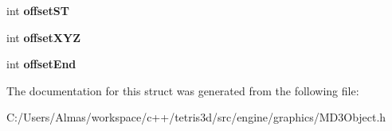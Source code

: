 \begin{DoxyCompactItemize}
\item 
\hypertarget{struct_surface_ad45e1c14f0ad7da8318575974d461d50}{int {\bfseries offset\-S\-T}}\label{struct_surface_ad45e1c14f0ad7da8318575974d461d50}

\item 
\hypertarget{struct_surface_affc32d8546d0131a35da7cce858ecdb4}{int {\bfseries offset\-X\-Y\-Z}}\label{struct_surface_affc32d8546d0131a35da7cce858ecdb4}

\item 
\hypertarget{struct_surface_a8e2c382ec7c59175e2a0b0475210c798}{int {\bfseries offset\-End}}\label{struct_surface_a8e2c382ec7c59175e2a0b0475210c798}

\end{DoxyCompactItemize}


The documentation for this struct was generated from the following file\-:\begin{DoxyCompactItemize}
\item 
C\-:/\-Users/\-Almas/workspace/c++/tetris3d/src/engine/graphics/M\-D3\-Object.\-h\end{DoxyCompactItemize}
